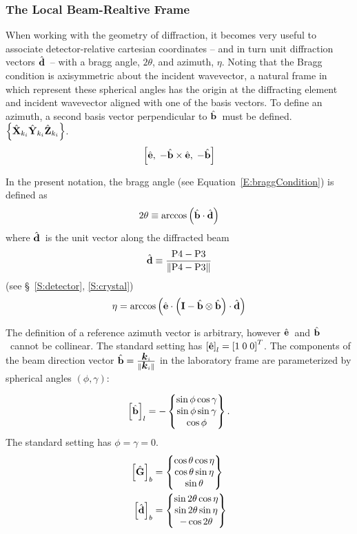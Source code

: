 \documentclass[12pt,letterpaper,final]{amsart}
\newcommand{\mbm}[1]{\ensuremath{\mbox{\boldmath$#1$}}}
\newcommand{\ghat}{\ensuremath{\hat{\mbm{\mathrm{G}}}}}
\newcommand{\bhat}{\ensuremath{\hat{\mbm{\mathrm{b}}}}}
\newcommand{\dhat}{\ensuremath{\hat{\mbm{\mathrm{d}}}}}
\newcommand{\ehat}{\ensuremath{\hat{\mbm{\mathrm{e}}}}}
\newcommand{\eye}{\ensuremath{\mbm{\mathrm{I}}}}
\newcommand{\Pthree}{\ensuremath{\mathrm{P3}}}
\newcommand{\Pfour}{\ensuremath{\mathrm{P4}}}
\newcommand{\Xb}{\ensuremath{\hat{\mbm{\mathrm{X}}}_{k_i}}}
\newcommand{\Yb}{\ensuremath{\hat{\mbm{\mathrm{Y}}}_{k_i}}}
\newcommand{\Zb}{\ensuremath{\hat{\mbm{\mathrm{Z}}}_{k_i}}}
\newcommand{\beamframe}{\ensuremath{\left\{\Xb\Yb\Zb\right\}}}
\newcommand{\labcomps}[1]{\left[#1\right]_l}
\newcommand{\beamcomps}[1]{\left[#1\right]_b}
\newcommand{\eqnref}[1]{Equation~\ref{#1}}
\newcommand{\secref}[1]{\S~\ref{#1}}
\begin{document}
\subsubsection{The Local Beam-Realtive Frame}
When working with the geometry of diffraction, it becomes very useful to associate detector-relative cartesian coordinates -- and in turn unit diffraction vectors \dhat\ -- with a bragg angle, $2\theta$, and azimuth, $\eta$.  Noting that the Bragg condition is axisymmetric about the incident wavevector, a natural frame in which represent these spherical angles has the origin at the diffracting element and incident wavevector aligned with one of the basis vectors.  To define an azimuth, a second basis vector perpendicular to \bhat\ must be defined.  \beamframe.
\begin{equation}
  \left[ \ehat,\; -\bhat\times\ehat,\; -\bhat \right]
  \label{E:etaFrame}
\end{equation}

In the present notation, the bragg angle (see \eqnref{E:braggCondition}) is defined as
\begin{equation}
  2\theta \equiv \arccos{\left( \bhat \cdot \dhat \right)}
\end{equation}
where \dhat\ is the unit vector along the diffracted beam 
\begin{displaymath}
  \dhat \equiv \frac{\Pfour-\Pthree}{\|\Pfour-\Pthree\|}
\end{displaymath}
(see \secref{S:detector}, \ref{S:crystal})
\begin{equation}
  \eta = \arccos{\left(\ehat \cdot \left( \eye - \bhat \otimes \bhat \right)\cdot\dhat\right)}
\end{equation}

The definition of a reference azimuth vector is arbitrary, however \ehat\ and \bhat\ cannot be collinear.  The standard setting has $\labcomps{\ehat}=\left[1\;0\;0\right]^T$.  The components of the beam direction vector $\bhat=\frac{\mbm{k}_i}{\|\mbm{k}_i\|}$ in the laboratory frame are parameterized by spherical angles $(\phi, \gamma)$:

\begin{equation}
  \labcomps{\bhat} = -\begin{Bmatrix}
    \sin\phi \cos\gamma \\
    \sin\phi \sin\gamma \\
    \cos\phi
  \end{Bmatrix}.
\end{equation}
The standard setting has $\phi=\gamma=0$.
\begin{align}
  \beamcomps{\ghat} &= \begin{Bmatrix}
    \cos\theta \cos\eta \\
    \cos\theta \sin\eta \\
    \sin\theta
  \end{Bmatrix}\\
  \beamcomps{\dhat} &= \begin{Bmatrix}
    \sin2\theta \cos\eta \\
    \sin2\theta \sin\eta \\
    -\cos2\theta
  \end{Bmatrix}
\end{align}
\end{document}

